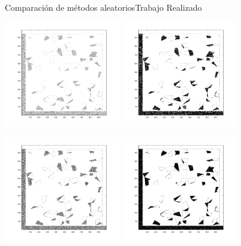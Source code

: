 \documentclass[10pt]{beamer}
\begin{document}
\begin{frame}{Comparación de métodos aleatorios}{Trabajo Realizado}
\vfill
\begin{center}
\includegraphics[width=0.38\textwidth]{demo21}
\includegraphics[width=0.38\textwidth]{demo22}

\includegraphics[width=0.38\textwidth]{demo23}
\includegraphics[width=0.38\textwidth]{demo24}
\end{center}
\end{frame}
\end{document}

